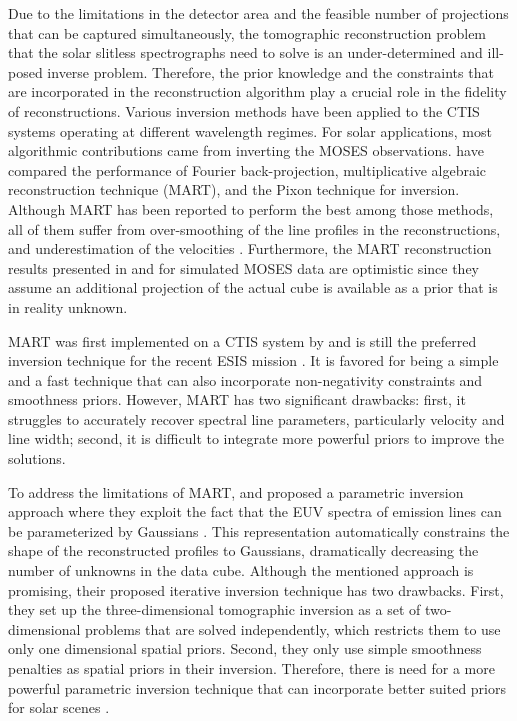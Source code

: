 \documentclass[linenumbers,twocolumn]{aastex7}
\begin{document}
Due to the limitations in the detector area and the feasible number of
projections that can be captured simultaneously, the tomographic reconstruction
problem that the solar slitless spectrographs need to solve is an
under-determined and ill-posed inverse problem. Therefore, the prior knowledge
and the constraints that are incorporated in the reconstruction algorithm play a
crucial role in the fidelity of reconstructions.
Various inversion methods have been applied to the CTIS systems operating at
different wavelength regimes. For solar applications, most algorithmic 
contributions came from inverting the MOSES observations. \citet{fox2003data} have
compared the performance of Fourier back-projection, multiplicative algebraic
reconstruction technique (MART), and the Pixon technique for inversion. Although
MART has been reported to perform the best among those methods, all of them
suffer from over-smoothing of the line profiles in the reconstructions, and
underestimation of the velocities \citep{fox2011snapshot}. Furthermore, the
MART reconstruction results presented in \citet{fox2003data} and
\citet{fox2011snapshot} for simulated MOSES data are optimistic since they assume
an additional projection of the actual cube is available as a prior that is in
reality unknown.

MART was first implemented on a CTIS system by \citet{okamoto1991simultaneous}
and is still the preferred inversion technique for the recent ESIS mission
\citep{parker2022first}. It is favored for being a simple and a fast 
technique that can also incorporate non-negativity constraints and smoothness
priors. However, MART has two significant drawbacks: first, it struggles to accurately
recover spectral line parameters, particularly velocity and line width; second,
it is difficult to integrate more powerful priors to improve the solutions.

To address the limitations of MART, \citet{oktem2014parametric} and
\citet{davila2019slitless} proposed a parametric inversion approach where they 
exploit the fact that the EUV spectra of emission lines can be parameterized by
Gaussians \citep{rybicki2008radiative, ireland2005precision}. This
representation automatically constrains the shape of the reconstructed profiles
to Gaussians, dramatically decreasing the number of unknowns in the data cube.
Although the mentioned approach is promising, their proposed iterative
inversion technique has two drawbacks. First, they set up the three-dimensional
tomographic inversion as a set of two-dimensional problems that are solved
independently, which restricts them to use only one dimensional spatial priors.
Second, they only use simple smoothness penalties as spatial priors in their
inversion. Therefore, there is need for a more powerful parametric inversion
technique that can incorporate better suited priors for solar scenes
\citep{davila2019slitless}.
\end{document}
